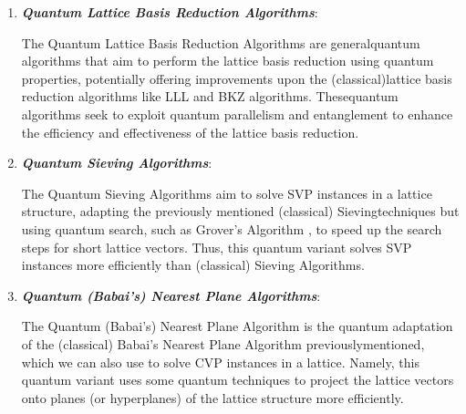 \documentclass[runningheads]{llncs}
\numberwithin{equation}{section}
\begin{document}
    \begin{enumerate}
        
        \item \textbf{\textit{Quantum Lattice Basis Reduction Algorithms}}:
        \vspace{0.6ex}

        The Quantum Lattice Basis Reduction Algorithms \cite{ludwig:faster-lattice-reduction-method-using-quantum-search:2003:06-2024,ambainis-kempe:quantum-lovasz-local-lemma:2012:06-2024,tiepelt-szepieniec:quantum-lll-application-mersenne-number-cryptosystems:2019:06-2024,gilyen:quantum-singular-value-transformation-algorithmic-applications:2019:06-2024} are general\break quantum algorithms that aim to perform the lattice basis reduction using quantum properties, potentially offering improvements upon the (classical)\break lattice basis reduction algorithms like LLL and BKZ algorithms. These\break quantum algorithms seek to exploit quantum parallelism and entanglement to enhance the efficiency and effectiveness of the lattice basis reduction.
    
        \vspace{2ex}    
        \item \textbf{\textit{Quantum Sieving Algorithms}}:
        \vspace{0.6ex}
        
        The Quantum Sieving Algorithms \cite{laarhoven-mosca-van-de-pol:finding-shortest-lattice-vectors-faster-using-quantum-search:2015:06-2024,kirshanova-et-al:quantum-algorithms-approximate-k-list-problem-application-lattice-sieving:2019:06-2024,chailloux-loyer:lattice-sieving-via-quantum-walks:2021:06-2024} aim to solve SVP instances in a lattice structure, adapting the previously mentioned (classical) Sieving\break techniques but using quantum search, such as Grover's Algorithm \cite{grover:fast-quantum-mechanical-algorithm-database-search:1996:06-2024}, to speed up the search steps for short lattice vectors. Thus, this quantum variant solves SVP instances more efficiently than (classical) Sieving Algorithms.

        \vspace{2ex}
        \item \textbf{\textit{Quantum (Babai's) Nearest Plane Algorithms}}:
        \vspace{0.6ex}

        The Quantum (Babai's) Nearest Plane Algorithm \cite{lv-et-al:using-variational-quantum-algorithm-solve-lwe-problem:2022:06-2024,grebnev-et-al:pitfalls-sublinear-qaoa-based-factorization-algorithm:2023:06-2024} is the quantum adaptation of the (classical) Babai's Nearest Plane Algorithm previously\break mentioned, which we can also use to solve CVP instances in a lattice. Namely, this quantum variant uses some quantum techniques to project the lattice vectors onto planes (or hyperplanes) of the lattice structure more efficiently.


\end{enumerate}
\end{document}
